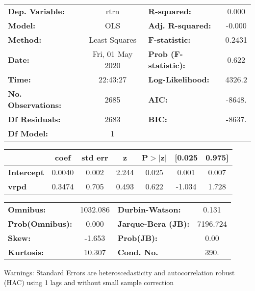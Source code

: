 \begin{center}
\begin{tabular}{lclc}
\toprule
\textbf{Dep. Variable:}    &       rtrn       & \textbf{  R-squared:         } &     0.000   \\
\textbf{Model:}            &       OLS        & \textbf{  Adj. R-squared:    } &    -0.000   \\
\textbf{Method:}           &  Least Squares   & \textbf{  F-statistic:       } &    0.2431   \\
\textbf{Date:}             & Fri, 01 May 2020 & \textbf{  Prob (F-statistic):} &    0.622    \\
\textbf{Time:}             &     22:43:27     & \textbf{  Log-Likelihood:    } &    4326.2   \\
\textbf{No. Observations:} &        2685      & \textbf{  AIC:               } &    -8648.   \\
\textbf{Df Residuals:}     &        2683      & \textbf{  BIC:               } &    -8637.   \\
\textbf{Df Model:}         &           1      & \textbf{                     } &             \\
\bottomrule
\end{tabular}
\begin{tabular}{lcccccc}
                   & \textbf{coef} & \textbf{std err} & \textbf{z} & \textbf{P$> |$z$|$} & \textbf{[0.025} & \textbf{0.975]}  \\
\midrule
\textbf{Intercept} &       0.0040  &        0.002     &     2.244  &         0.025        &        0.001    &        0.007     \\
\textbf{vrpd}      &       0.3474  &        0.705     &     0.493  &         0.622        &       -1.034    &        1.728     \\
\bottomrule
\end{tabular}
\begin{tabular}{lclc}
\textbf{Omnibus:}       & 1032.086 & \textbf{  Durbin-Watson:     } &    0.131  \\
\textbf{Prob(Omnibus):} &   0.000  & \textbf{  Jarque-Bera (JB):  } & 7196.724  \\
\textbf{Skew:}          &  -1.653  & \textbf{  Prob(JB):          } &     0.00  \\
\textbf{Kurtosis:}      &  10.307  & \textbf{  Cond. No.          } &     390.  \\
\bottomrule
\end{tabular}
\end{center}

Warnings: \newline
 [1] Standard Errors are heteroscedasticity and autocorrelation robust (HAC) using 1 lags and without small sample correction